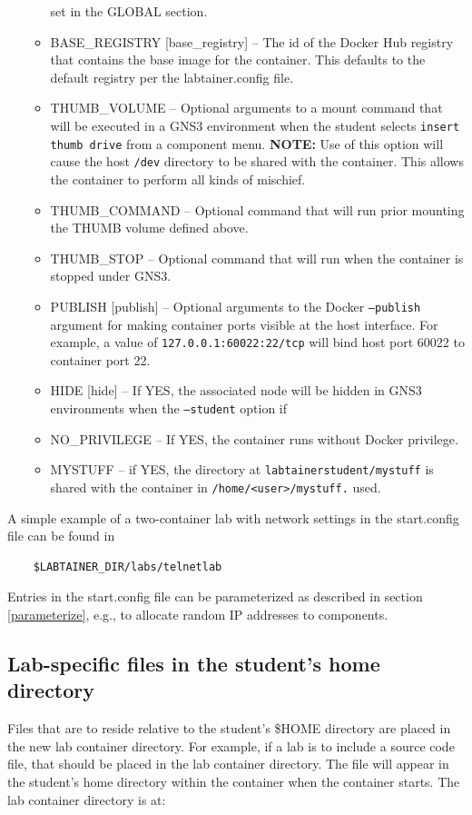 \documentclass[12pt]{article}
\begin{document}
\begin{itemize}
\begin{itemize}
set in the GLOBAL section. 
\item BASE\_REGISTRY [base\_registry] -- The id of the Docker Hub registry that contains the base image for the container.  This defaults
to the default registry per the labtainer.config file.
\item THUMB\_VOLUME -- Optional arguments to a mount command that will be executed in a GNS3 environment when the student selects
{\tt insert thumb drive} from a component menu.  \textbf{NOTE:} Use of this option will cause the host {\tt /dev} directory to be shared
with the container.  This allows the container to perform all kinds of mischief.
\item THUMB\_COMMAND -- Optional command that will run prior mounting the THUMB volume defined above.
\item THUMB\_STOP -- Optional command that will run when the container is stopped under GNS3.
\item PUBLISH [publish] -- Optional arguments to the Docker {\tt --publish} argument for making container ports visible at the
host interface.  For example, a value of {\tt 127.0.0.1:60022:22/tcp} will bind host port 60022 to container port 22.
\item HIDE [hide] -- If YES, the associated node will be hidden in GNS3 environments when the {\tt --student} option if
\item NO\_PRIVILEGE -- If YES, the container runs without Docker privilege.
\item MYSTUFF -- if YES, the directory at {\tt labtainerstudent/mystuff} is shared with the container in {\tt /home/<user>/mystuff.}
used.

\end{itemize}
\end{itemize}
  
A simple example of a two-container lab with network settings in the start.config file can be found in 
\begin{verbatim}
    $LABTAINER_DIR/labs/telnetlab
\end{verbatim}
Entries in the start.config file can be parameterized as described in section \ref{parameterize}, e.g., to allocate
random IP addresses to components.


\subsection {Lab-specific files in the student's home directory}
\label{home files}
Files that are to reside relative to the student's \$HOME directory are placed in the 
new lab container directory.  For example, if a lab is to include a source code file, that
should be placed in the lab container directory. The file will appear in the student's
home directory within the container when the container starts.  The lab container
directory is at:  
\end{document}
